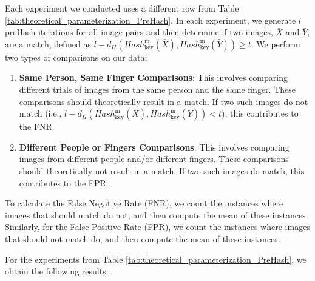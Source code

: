 Each experiment we conducted uses a different row from Table \ref{tab:theoretical_parameterization_PreHash}. In each experiment, we generate \( l \) preHash iterations for all image pairs and then determine if two images, \(\bar{X}\) and \(\bar{Y}\), are a match, defined as \( l - d_H(Hash_{\text{key}}^\text{m}(\bar{X}), Hash_{\text{key}}^\text{m}(\bar{Y})) \geq t \). We perform two types of comparisons on our data:


\begin{enumerate}
    \item \textbf{Same Person, Same Finger Comparisons}: This involves comparing different trials of images from the same person and the same finger. These comparisons should theoretically result in a match. If two such images do not match (i.e., \( l - d_H(Hash_{\text{key}}^\text{m}(\bar{X}), Hash_{\text{key}}^\text{m}(\bar{Y})) < t \)), this contributes to the FNR.
    \item \textbf{Different People or Fingers Comparisons}: This involves comparing images from different people and/or different fingers. These comparisons should theoretically not result in a match. If two such images do match, this contributes to the FPR.
\end{enumerate}

To calculate the False Negative Rate (FNR), we count the instances where images that should match do not, and then compute the mean of these instances. Similarly, for the False Positive Rate (FPR), we count the instances where images that should not match do, and then compute the mean of these instances.

For the experiments from Table \ref{tab:theoretical_parameterization_PreHash}, we obtain the following results:

